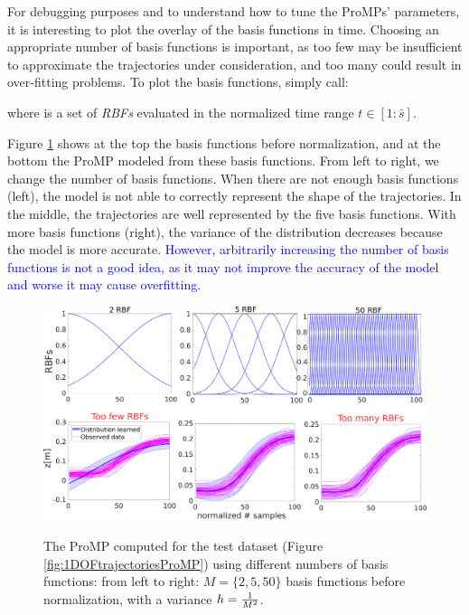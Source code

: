 \documentclass[utf8]{frontiersSCNS} %
\newcommand{\rev}[1]{\textcolor{blue}{#1}}
\newcommand{\todo}[1]{\textcolor{red}{\textbf{/*#1*/}}}
\begin{document}

For debugging purposes and to understand how to tune the ProMPs' parameters, it is interesting to plot the overlay of the basis functions in time. Choosing an appropriate number of basis functions is important, as too few may be insufficient to approximate the trajectories under consideration, and too many could result in over-fitting problems.
To plot the basis functions, simply call: 


where  is a set of \textit{RBFs} evaluated in the normalized time range $t \in [1:\bar{s}]$.

Figure \ref{fig:1DOFtrajectoriesProMPbasis} shows at the top the basis functions before normalization, and at the bottom the ProMP modeled from these basis functions. From left to right, we change the number of basis functions. When there are not enough basis functions (left), the model is not able to correctly represent the shape of the trajectories. In the middle, the trajectories are well represented by the five basis functions. With more basis functions (right), the variance of the distribution decreases because the model is more accurate. 
\rev{However, arbitrarily increasing the number of basis functions is not a good idea, as it may not improve the accuracy of the model and worse it may cause overfitting. }

\begin{figure}[h]
\centering
{
\includegraphics[width=\hsize]{img/1DOFtrajectoriesProMPbasisV4.pdf}
}
\caption{The ProMP computed for the test dataset (Figure \ref{fig:1DOFtrajectoriesProMP}) using different numbers of basis functions: from left to right: $M=\{2,5,50\}$ basis functions before normalization, with a variance $h={1 \over M^2}$. }
\label{fig:1DOFtrajectoriesProMPbasis}
\end{figure}
\end{document}
